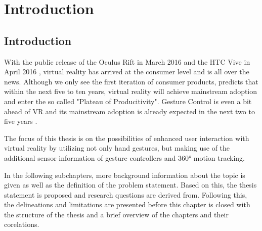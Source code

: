 
\chapter{Introduction} %

\label{ChapterIntroduction} %


\section{Introduction}

With the public release of the Oculus Rift in March 2016 \citep{Oculus2016} and the HTC Vive in April 2016 \citep{Htcvive2016}, virtual reality has arrived at the consumer level and is all over the news. Although we only see the first iteration of consumer products, \cite{Gartner2015} predicts that within the next five to ten years, virtual reality will achieve mainstream adoption and enter the so called "Plateau of Producitivity". Gesture Control is even a bit ahead of VR and its mainstream adoption is already expected in the next two to five years \citep{Gartner2015}.

The focus of this thesis is on the possibilities of enhanced user interaction with virtual reality by utilizing not only hand gestures, but making use of the additional sensor information of gesture controllers and 360° motion tracking.

In the following subchapters, more background information about the topic is given as well as the definition of the problem statement. Based on this, the thesis statement is proposed and research questions are derived from. Following this, the delineations and limitations are presented before this chapter is closed with the structure of the thesis and a brief overview of the chapters and their corelations.




